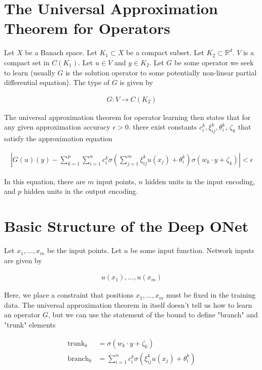 \documentclass[book.tex]{subfiles}
\begin{document}
\section{The Universal Approximation Theorem for Operators}
Let $X$ be a Banach space. Let $K_1 \subset X$ be a compact subset. Let $K_2 \subset \mathbb{R}^d$. $V$ is a compact set in $C(K_1)$. Let $u \in V$ and $y \in K_2$. Let $G$ be some operator we seek to learn (usually $G$ is the solution operator to some potentially non-linear partial differential equation). The type of $G$ is given by

\begin{align}
    G: V \to C(K_2)
\end{align}

The universal approximation theorem for operator learning then states that for any given approximation accuracy $\epsilon > 0$. there exist constants $c_i^k, \xi_{ij}^k, \theta_i^k$, $\zeta_k$ that satisfy the approximation equation

\begin{align}
    \left | G(u)(y) - \sum_{k=1}^p \sum_{i=1}^n c_i^k \sigma \left ( \sum_{j=1}^m \xi^k_{ij} u(x_j)+ \theta^k_i \right ) \sigma(w_k \cdot y + \zeta_k) \right | < \epsilon 
\end{align}

In this equation, there are $m$ input points, $n$ hidden units in the input encoding, and $p$ hidden units in the output encoding.

\section{Basic Structure of the Deep ONet}

Let $x_1,\dotsc, x_m$ be the input points. Let $u$ be some input function. Network inputs are given by 

\begin{align}
u(x_1),\dotsc, u(x_m)
\end{align}

Here, we place a constraint that positions $x_1,\dotsc,x_m$ must be fixed in the training data. The universal approximation theorem in itself doesn't tell us how to learn an operator $G$, but we can use the statement of the bound to define "branch" and "trunk" elements


\begin{align}
\textrm{trunk}_k &= \sigma(w_k \cdot y + \zeta_k) \\
\textrm{branch}_k &= \sum_{i=1}^n c^k_i \sigma \left ( \xi^k_{ij} u(x_j) + \theta^k_i \right )
\end{align}
\end{document}
